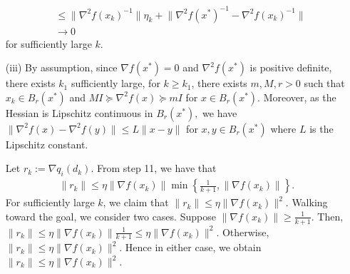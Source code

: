 \documentclass{ExerciseSheet}
\begin{document}
\begin{solution}
\begin{itemize}
\begin{align*}
            &\leq \lVert\nabla^2 f(x_k)^{-1}\lVert \eta_k+\lVert \nabla^2 f(x^*)^{-1}-\nabla^2 f(x_k)^{-1}\rVert\\
            & \rightarrow 0
        \end{align*}
        for sufficiently large $k$.
        \item[(iii)] By assumption, since $\nabla f(x^*)=0$ and $\nabla^2 f(x^*)$ is positive definite, there exists $k_1$ sufficiently large, for $k\geq k_1$, there exists $m,M,r>0$ such that $x_k \in B_r(x^*)$ and $MI \succeq \nabla^2f(x)\succeq  mI$ for $x \in B_r(x^*)$. Moreover, as the Hessian is Lipschitz continuous in $B_r(x^*),$ we have $\lVert\nabla^2 f(x)-\nabla^2 f(y)\rVert \leq L\lVert x-y\rVert $ for $x,y \in B_r(x^*)$ where $L$ is the Lipschitz constant.
        
        Let $r_k:=\nabla q_i(d_k)$. From step 11, we have that 
        \begin{align*}
            \lVert r_k \rVert \leq \eta \lVert \nabla f(x_k)\rVert \min \left\{\frac{1}{k+1}, \lVert \nabla f(x_k)\rVert\right\}. 
        \end{align*}
        For sufficiently large $k$, we claim that $\lVert r_k \rVert \leq \eta \lVert \nabla f(x_k)\rVert^2$. Walking toward the goal, we consider two cases. Suppose $\lVert \nabla f(x_k)\rVert \geq \frac{1}{k+1}$. Then, $\lVert r_k\rVert \leq \eta \lVert \nabla f(x_k)\rVert\frac{1}{k+1}\leq \eta \lVert \nabla f(x_k)\rVert^2$. Otherwise, $\lVert r_k\rVert \leq \eta \lVert \nabla f(x_k)\rVert^2$. Hence in either case, we obtain $\lVert r_k \rVert \leq \eta \lVert \nabla f(x_k)\rVert^2$.


\end{itemize}
\end{solution}
\end{document}
